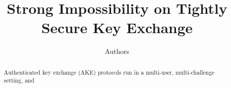 \documentclass{llncs}
\title{Strong Impossibility on Tightly Secure Key Exchange}
\date{\now}
\author{Authors}
\institute{Institutes}
\begin{document}
\maketitle

\begin{abstract}
	Authenticated key exchange (AKE) protocols run in a multi-user, multi-challenge setting, and 
\end{abstract}












\appendix




\end{document}
